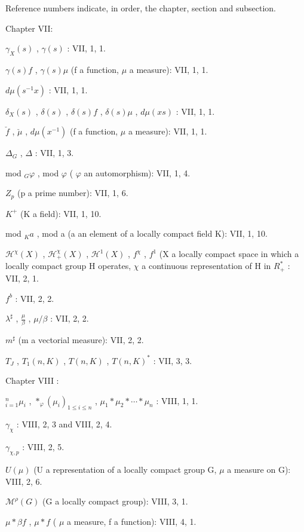 
Reference numbers indicate, in order, the chapter, section and subsection.

Chapter VII:

\(\gamma_{X}(s)\) , \(\gamma(s)\) : VII, 1, 1.

\(\gamma(s)f\) , \(\gamma(s)\mu\) (f a function, \(\mu\) a measure): VII, 1, 1.

\(d\mu(s^{-1}x)\) : VII, 1, 1.

\(\delta_{X}(s)\) , \(\delta(s)\) , \(\delta(s)f\) , \(\delta(s)\mu\) , \(d\mu(xs)\) : VII, 1, 1.

\(\check{f}\) , \(\check{\mu}\) , \(d\mu(x^{-1})\) (f a function, \(\mu\) a measure): VII, 1, 1.

\(\Delta_{G}\) , \(\Delta\) : VII, 1, 3.

mod \(_{G}\varphi\) , mod \(\varphi\) ( \(\varphi\) an automorphism): VII, 1, 4.

\(Z_{p}\) (p a prime number): VII, 1, 6.

\(K^{+}\) (K a field): VII, 1, 10.

mod \(_{K}a\) , mod a (a an element of a locally compact field K): VII, 1, 10.

\(\mathcal{H}^{\chi}(X)\) , \(\mathcal{H}_{+}^{\chi}(X)\) , \(\mathcal{H}^{1}(X)\) , \(f^{\chi}\) , \(f^{1}\) (X a locally compact space in which a locally compact group H operates, \(\chi\) a continuous representation of H in \(R_{+}^{*}\) : VII, 2, 1.

\(f^{b}\) : VII, 2, 2.

\(\lambda^{\sharp}\) , \(\frac{\mu}{\beta}\) , \(\mu/\beta\) : VII, 2, 2.

\(m^{\sharp}\) (m a vectorial measure): VII, 2, 2.

\(T_{J}\) , \(T_{1}(n,K)\) , \(T(n,K)\) , \(T(n,K)^{*}\) : VII, 3, 3.

Chapter VIII :

\(^{n}_{i=1}\mu_{i}\) , \(*_{\varphi}(\mu_{i})_{1\leqslant i\leqslant n}\) , \(\mu_{1}*\mu_{2}*\cdots*\mu_{n}\) : VIII, 1, 1.

\(\gamma_{\chi}\) : VIII, 2, 3 and VIII, 2, 4.

\(\gamma_{\chi,p}\) : VIII, 2, 5.

\(U(\mu)\) (U a representation of a locally compact group G, \(\mu\) a measure on G): VIII, 2, 6.

\(\mathcal{M}^{\rho}(G)\) (G a locally compact group): VIII, 3, 1.

\(\mu*\beta f\) , \(\mu*f\) ( \(\mu\) a measure, f a function): VIII, 4, 1.

